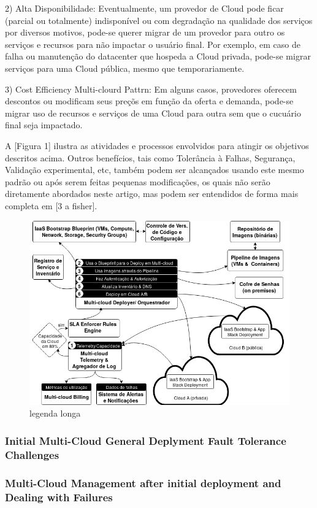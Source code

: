 \documentclass[12pt]{article}
\begin{document}
	2) Alta Disponibilidade: Eventualmente, um provedor de Cloud pode ficar (parcial ou totalmente) indisponível ou com degradação na qualidade dos serviços por diversos motivos, pode-se querer migrar de um provedor para outro os serviços e recursos para não impactar o usuário final. Por exemplo, em caso de falha ou manutenção do datacenter que hospeda a Cloud privada, pode-se migrar serviços para uma Cloud pública, mesmo que temporariamente.
	   
	3) Cost Efficiency Multi-clourd Pattrn: Em alguns casos, provedores oferecem descontos ou modificam seus preçõs em função da oferta e demanda, pode-se migrar uso de recursos e serviços de uma Cloud para outra sem que o cucuário final seja impactado.
	
	A [Figura 1] ilustra as atividades e processos envolvidos para atingir os objetivos descritos acima. Outros benefícios, tais como Tolerância à Falhas, Segurança, Validação experimental, etc, também podem ser alcançados usando este mesmo padrão ou após serem feitas pequenas modificações, os quais não serão diretamente abordados neste artigo, mas podem ser entendidos de forma mais completa em [3 a fisher].
	
		\begin{figure}[H]
			\centering
			\includegraphics[width=0.9\linewidth]{Figure1.png}
			\caption{legenda longa}
			\label{fig:figure1}
		\end{figure}
	

	\subsubsection{Initial Multi-Cloud General Deplyment Fault Tolerance Challenges}
	
	\subsubsection{Multi-Cloud Management after initial deployment and Dealing with Failures}
	
\end{document}
